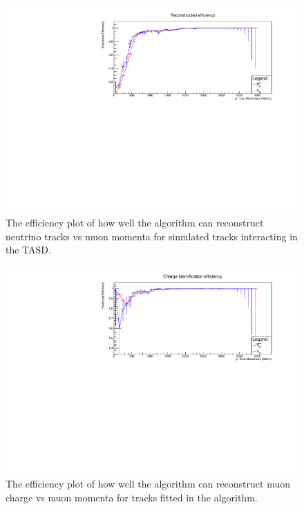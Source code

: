 \begin{figure}[h!]
\centering
\includegraphics[width=.9\textwidth]{figures/NeutrinoChap/Neutrino/NuStormRecEff.pdf}
\caption{The efficiency plot of how well the algorithm can reconstruct neutrino tracks vs muon momenta for simulated tracks interacting in the TASD.}
\label{fig:NuSTORMTASDfitted}
\end{figure}

\begin{figure}[h!]
\centering
\includegraphics[width=.9\textwidth]{figures/NeutrinoChap/Neutrino/NuStormChargeEff.pdf}
\caption{The efficiency plot of how well the algorithm can reconstruct muon charge vs muon momenta for tracks fitted in the algorithm.}
\label{fig:NuSTORMTASDfittedcharge}
\end{figure}

